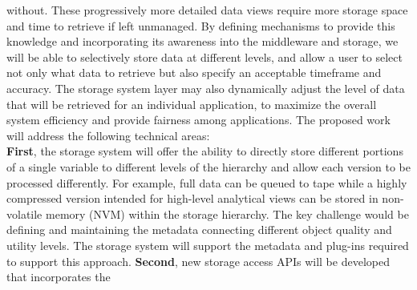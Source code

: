 \documentclass[11pt,letterpaper]{article}
\newcommand{\hasan}[1]{{\it \color{darkgreen} #1 -Hasan }}
\newcommand{\hasan}[1]{}
\begin{document}
without. These progressively more detailed data views require more storage
space and time to retrieve if left unmanaged. By defining mechanisms to provide this 
knowledge and incorporating its awareness into the middleware and storage,
we will be able to selectively store data at different levels, and allow a user to select 
not only what data to retrieve but also specify an acceptable timeframe and accuracy.
The storage system layer may also dynamically 
adjust the level of data that will be retrieved
for an individual application,  to maximize the overall system efficiency and 
provide fairness among applications.
%
%
The proposed work will address the following technical areas:
\\\textbf{First}, the storage system will offer the ability to directly store
different portions of a single variable to different
levels of the hierarchy and allow each version to be processed 
differently. For example, full data can be queued to tape while
a highly compressed version intended for high-level analytical views can be
stored in non-volatile memory (NVM)  within the storage
hierarchy. 
The key challenge would be defining and maintaining the metadata
connecting different object quality and utility levels. 
The storage system will support the metadata and plug-ins required to support
this approach.   
%
\textbf{Second}, new storage access APIs will be developed that incorporates the
\end{document}
